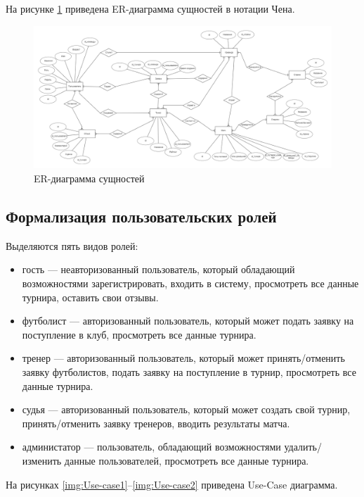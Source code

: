 \newpage

На рисунке \ref{img:ERdiagram} приведена ER-диаграмма сущностей в нотации Чена.

\begin{figure}[h]
	\centering
	\includegraphics[height=0.3\textheight]{img/ER-diagram.png}
	\caption{ER-диаграмма сущностей}
	\label{img:ERdiagram}
\end{figure}
\subsection{Формализация пользовательских ролей}

Выделяются пять видов ролей:
\begin{itemize}
	\item гость --- неавторизованный пользователь, который обладающий возможностями зарегистрировать, входить в систему, просмотреть все данные турнира, оставить свои отзывы.
	\item футболист --- авторизованный пользователь, который может подать заявку на поступление в клуб, просмотреть все данные турнира.
	\item тренер --- авторизованный пользователь, который может принять/отменить заявку футболистов, подать заявку на поступление в турнир, просмотреть все данные турнира.
	\item судья --- авторизованный пользователь, который может создать свой турнир, принять/отменить заявку тренеров, вводить результаты матча.
	\item администатор --- пользователь, обладающий возможностями удалить/изменить данные пользователей, просмотреть все данные турнира.
\end{itemize}

На рисунках \ref{img:Use-case1}--\ref{img:Use-case2} приведена Use-Case диаграмма.


